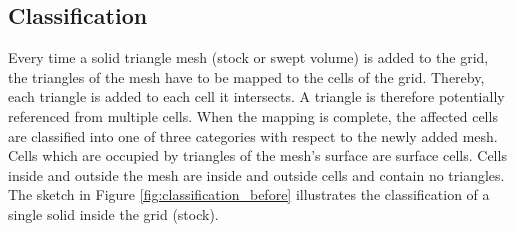 \subsection{Classification}
\label{sec:classification}

Every time a solid triangle mesh (stock or swept volume) is added to the grid, the triangles of the mesh have to be mapped to the cells of the grid.
Thereby, each triangle is added to each cell it intersects.
A triangle is therefore potentially referenced from multiple cells.
When the mapping is complete, the affected cells are classified into one of three categories with respect to the newly added mesh.
Cells which are occupied by triangles of the mesh's surface are surface cells.
Cells inside and outside the mesh are inside and outside cells and contain no triangles.
The sketch in Figure \ref{fig:classification_before} illustrates the classification of a single solid inside the grid (\ie stock).

